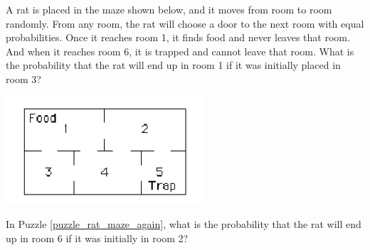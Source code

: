 \begin{puzzle}\label{puzzle_rat_maze_again}
    A rat is placed in the maze shown below, and it moves from room to room randomly. From any room, the rat will choose a door to the next room with equal probabilities. Once it reaches room 1, it finds food and never leaves that room. And when it reaches room 6, it is trapped and cannot leave that room. What is the probability that the rat will end up in room 1 if it was initially placed in room 3?

    \begin{center}
        \includegraphics{chapters/markov_hw/section03/maze.png}
    \end{center}
\end{puzzle}

\begin{puzzle}
    In Puzzle \ref{puzzle_rat_maze_again}, what is the probability that the rat will end up in room 6 if it was initially in room 2?
\end{puzzle}